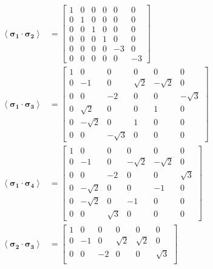 \documentclass[prd,twocolumn,floatfix,nofootinbib]{revtex4}
\begin{document}
    \begin{align}
        \left\langle \boldsymbol{\sigma_{1}}\cdot \boldsymbol{\sigma_{2}} \right\rangle&=
        \begin{bmatrix}
            1 & 0 & 0 & 0 & 0 & 0 \\
            0 & 1 & 0 & 0 & 0 & 0 \\
            0 & 0 & 1 & 0 & 0 & 0 \\
            0 & 0 & 0 & 1 & 0 & 0 \\
            0 & 0 & 0 & 0 & -3 & 0 \\
            0 & 0 & 0 & 0 & 0 & -3
        \end{bmatrix} \\ 
        \left\langle \boldsymbol{\sigma_{1}}\cdot \boldsymbol{\sigma_{3}} \right\rangle&=
        \begin{bmatrix}
            1 & 0 & 0 & 0 & 0 & 0 \\
            0 & -1 & 0 & \sqrt{2} & -\sqrt{2} & 0 \\
            0 & 0 & -2 & 0 & 0 & -\sqrt{3} \\
            0 & \sqrt{2} & 0 & 0 & 1 & 0 \\
            0 & -\sqrt{2} & 0 & 1 & 0 & 0 \\
            0 & 0 & -\sqrt{3} & 0 & 0 & 0
        \end{bmatrix} \\ 
        \left\langle \boldsymbol{\sigma_{1}}\cdot \boldsymbol{\sigma_{4}} \right\rangle&=
        \begin{bmatrix}
            1 & 0 & 0 & 0 & 0 & 0 \\
            0 & -1 & 0 & -\sqrt{2} & -\sqrt{2} & 0 \\
            0 & 0 & -2 & 0 & 0 & \sqrt{3} \\
            0 & -\sqrt{2} & 0 & 0 & -1 & 0 \\
            0 & -\sqrt{2} & 0 & -1 & 0 & 0 \\
            0 & 0 & \sqrt{3} & 0 & 0 & 0
        \end{bmatrix} \\ 
        \left\langle \boldsymbol{\sigma_{2}}\cdot \boldsymbol{\sigma_{3}} \right\rangle&=
        \begin{bmatrix}
            1 & 0 & 0 & 0 & 0 & 0 \\
            0 & -1 & 0 & \sqrt{2} & \sqrt{2} & 0 \\
            0 & 0 & -2 & 0 & 0 & \sqrt{3} \\

\end{bmatrix}
\end{align}
\end{document}

